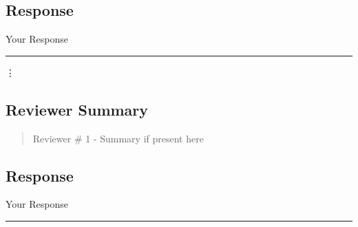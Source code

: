 \subsection{Response} 
Your Response

\noindent\rule{17cm}{2.0pt}

\vdots
\subsection{Reviewer Summary}
\begin{mdframed}
\begin{quote}
	Reviewer \# 1 - Summary if present here
\end{quote}
\end{mdframed}

\subsection{Response} 
Your Response


\noindent\rule{17cm}{6.0pt}